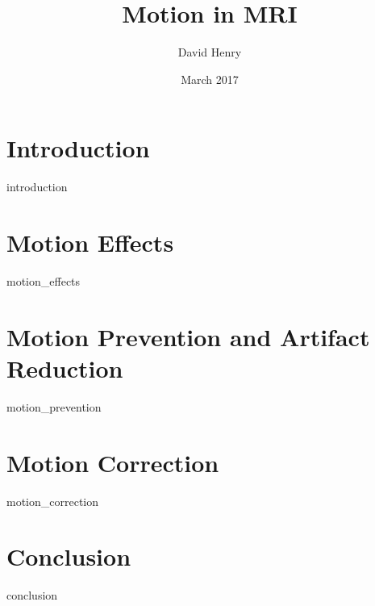 \documentclass{article}
\title{Motion in MRI}
\author{David Henry}
\date{March 2017}
\begin{document}
\maketitle

\tableofcontents

\section{Introduction} \label{Section1}
{introduction}

\section{Motion Effects} \label{Section2}
{motion_effects}

\section{Motion Prevention and Artifact Reduction} \label{Section3}
{motion_prevention}

\section{Motion Correction} \label{Section4}
{motion_correction}

\section{Conclusion} \label{Section5}
{conclusion}

\printbibliography
\end{document}
